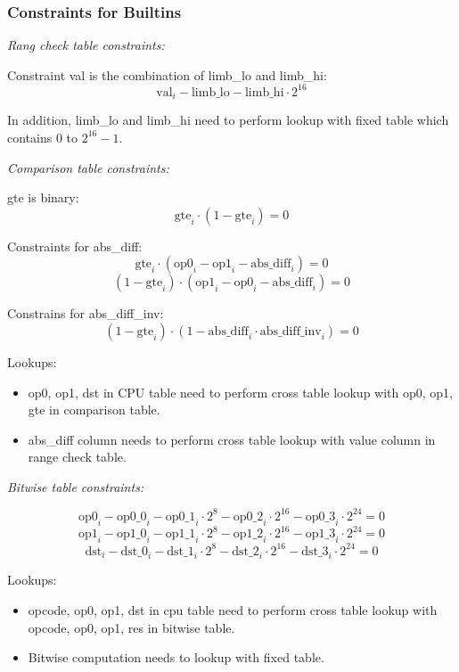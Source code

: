 \subsubsection{Constraints for Builtins} \label{sec:builtins-constraints}

\emph{Rang check table constraints:}

Constraint val is the combination of limb\_lo and limb\_hi:
\[ \mathrm{val}_i - \mathrm{limb\_lo} - \mathrm{limb\_hi} \cdot 2^{16} \]

In addition, limb\_lo and limb\_hi need to perform lookup with fixed table which contains 0 to $2^{16}-1$.

\emph{Comparison table constraints:}

gte is binary:
\[ \mathrm{gte}_i \cdot (1 - \mathrm{gte}_i) = 0 \]

Constraints for abs\_diff:
\[ \mathrm{gte}_i \cdot (\mathrm{op0}_i-\mathrm{op1}_i-\mathrm{abs\_diff}_i)=0 \]
\[ (1-\mathrm{gte}_i) \cdot (\mathrm{op1}_i-\mathrm{op0}_i-\mathrm{abs\_diff}_i)=0 \]

Constrains for abs\_diff\_inv:
\[ (1-\mathrm{gte}_i) \cdot (1-\mathrm{abs\_diff}_i \cdot \mathrm{abs\_diff\_inv}_i)=0 \]

Lookups:
\begin{itemize}
    \item op0, op1, dst in CPU table need to perform cross table lookup with op0, op1, gte in comparison table.
    \item abs\_diff column needs to perform cross table lookup with value column in range check table.
\end{itemize}

\emph{Bitwise table constraints:}

\[ \mathrm{op0}_i - \mathrm{op0\_0}_i - \mathrm{op0\_1}_i \cdot 2^{8} - \mathrm{op0\_2}_i \cdot 2^{16}- \mathrm{op0\_3}_i \cdot 2^{24} = 0 \]
\[ \mathrm{op1}_i - \mathrm{op1\_0}_i - \mathrm{op1\_1}_i \cdot 2^{8} - \mathrm{op1\_2}_i \cdot 2^{16}- \mathrm{op1\_3}_i \cdot 2^{24} = 0 \]
\[ \mathrm{dst}_i - \mathrm{dst\_0}_i - \mathrm{dst\_1}_i \cdot 2^{8} - \mathrm{dst\_2}_i \cdot 2^{16}- \mathrm{dst\_3}_i \cdot 2^{24} = 0 \]

Lookups:
\begin{itemize}
    \item opcode, op0, op1, dst in cpu table need to perform cross table lookup with opcode, op0, op1, res in bitwise table.
    \item Bitwise computation needs to lookup with fixed table.
\end{itemize}
